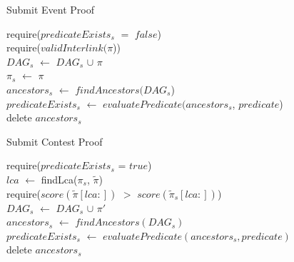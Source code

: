 \begin{algorithm}[H]
    \caption{Submit Event Proof}
    \label{algo:submit_old}
    require($predicateExists_{s}$ $=$ $false$) \\
    require($validInterlink(\pi$))\\
    $DAG_{s}$ $\leftarrow$ $DAG_{s}$ $\cup$ $\pi$\\
    $\pi_{s}$ $\leftarrow$ $\pi$\\
    $ancestors_{s}$ $\leftarrow$ $findAncestors(DAG_{s}$)\\
    $predicateExists_{s}$ $\leftarrow$ $evaluatePredicate(ancestors_{s}$,
    $predicate$)\\
    delete $ancestors_{s}$\\
\end{algorithm}

\begin{algorithm}
    \caption{Submit Contest Proof}
    \label{algo:contest_old}
    require($predicateExists_{s}$ = $true$) \\
    $lca$ $\leftarrow$ findLca($\pi_{s}$, $\tilde\pi$)\\
    require($score(\tilde\pi[lca:])$ $>$ $score(\tilde\pi_{s}[lca:])$) \\
    $DAG_{s}$ $\leftarrow$ $DAG_{s}$ $\cup$ $\pi'$\\
    $ancestors_{s}$ $\leftarrow$ $findAncestors(DAG_{s})$\\
    $predicateExists_{s}$ $\leftarrow$ $evaluatePredicate(ancestors_{s}, predicate)$\\
    delete $ancestors_{s}$\\
\end{algorithm}
